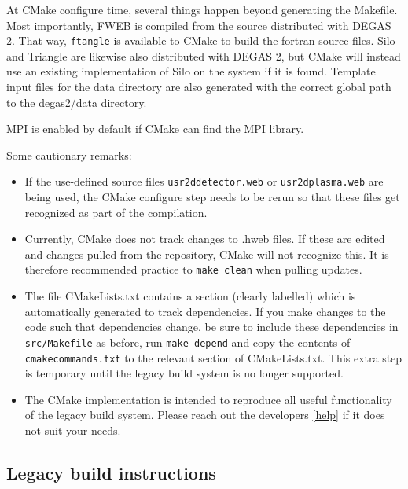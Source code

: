 \documentclass[12pt]{report}
\begin{document}
At CMake configure time, several things happen beyond generating the Makefile. 
Most importantly, FWEB is compiled from the source distributed with DEGAS 2. 
That way, {\tt ftangle} is available to CMake to build the fortran source files.
Silo and Triangle are likewise also distributed with DEGAS 2, but CMake will instead use an existing implementation of Silo on the system if it is found.
Template input files for the data directory are also generated with the correct global path to the degas2/data directory.

MPI is enabled by default if CMake can find the MPI library.

Some cautionary remarks:
\begin{itemize}
   \item If the use-defined source files \verb+usr2ddetector.web+ or \verb+usr2dplasma.web+ are being used, the CMake configure step needs to be rerun so that these files get recognized as part of the compilation.
   \item Currently, CMake does not track changes to .hweb files. If these are edited and changes pulled from the repository, CMake will not recognize this. It is therefore recommended practice to {\tt make clean} when pulling updates.
   \item The file CMakeLists.txt contains a section (clearly labelled) which is automatically generated to track dependencies. If you make changes to the code such that dependencies change, be sure to include these dependencies in {\tt src/Makefile} as before, run {\tt make depend} and copy the contents of {\tt cmakecommands.txt} to the relevant section of CMakeLists.txt. This extra step is temporary until the legacy build system is no longer supported.
   \item The CMake implementation is intended to reproduce all useful functionality of the legacy build system. Please reach out the developers \ref{help} if it does not suit your needs.
\end{itemize}

\subsection{Legacy build instructions}
\end{document}
